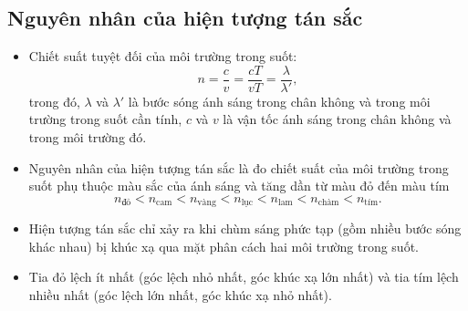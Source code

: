 \subsection{Nguyên nhân của hiện tượng tán sắc}
\begin{itemize}
	\item Chiết suất tuyệt đối của môi trường trong suốt: 
	\begin{equation}\label{eq:tansac1}
		n=\dfrac{c}{v}= \dfrac{cT}{vT}=\dfrac{\lambda}{\lambda'},
	\end{equation}
	trong đó, $\lambda$ và  $\lambda'$ là bước sóng ánh sáng trong chân không và trong môi trường trong suốt cần tính, $c$ và $v$ là vận tốc ánh sáng trong chân không và trong môi trường đó.
	
	\item Nguyên nhân của hiện tượng tán sắc là đo chiết suất của môi trường trong suốt phụ thuộc màu sắc của ánh sáng và tăng dần từ màu đỏ đến màu tím 
		\begin{equation}\label{eq:tansac2}
	n_\text{đỏ} < n_\text{cam} <n_\text{vàng} < n_\text{lục} <n_\text{lam} < n_\text{chàm} < n_\text{tím}.
		\end{equation}
	\item Hiện tượng tán sắc chỉ xảy ra khi chùm sáng phức tạp (gồm nhiều bước sóng khác nhau) bị khúc xạ qua mặt phân cách hai môi trường trong suốt.
	\item Tia đỏ lệch ít nhất (góc lệch nhỏ nhất, góc khúc xạ lớn nhất) và tia tím lệch nhiều nhất (góc lệch lớn nhất, góc khúc xạ nhỏ nhất).
\end{itemize}
	
